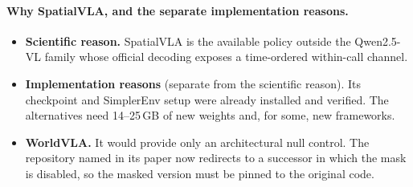 \paragraph{Why SpatialVLA, and the separate implementation reasons.}
\begin{itemize}
\item \textbf{Scientific reason.} SpatialVLA is the available policy outside the Qwen2.5-VL family whose official decoding exposes a time-ordered within-call channel.
\item \textbf{Implementation reasons} (separate from the scientific reason). Its checkpoint and SimplerEnv setup were already installed and verified. The alternatives need 14--25\,GB of new weights and, for some, new frameworks.
\item \textbf{WorldVLA.} It would provide only an architectural null control. The repository named in its paper now redirects to a successor in which the mask is disabled, so the masked version must be pinned to the original code.
\end{itemize}
